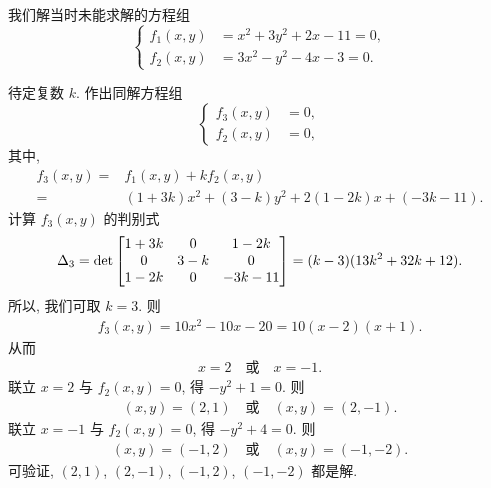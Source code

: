 \documentclass[../libro.tex]{subfiles}
\begin{document}
\begingroup
\renewcommand\thmcontinues[1]{续}
\begin{example}[continues=emp:A0301]
    我们解当时未能求解的方程组
    \begin{equation*}
        \left\{ %
        \begin{aligned}
            f_1 (x, y) & = x^2 + 3y^2 + 2x - 11 = 0, \\
            f_2 (x, y) & = 3x^2 - y^2 - 4x - 3 = 0.
        \end{aligned}
        \right. %
    \end{equation*}

    待定复数 \(k\).
    作出同解方程组
    \begin{equation*}
        \left\{ %
        \begin{aligned}
            f_3 (x, y) & = 0, \\
            f_2 (x, y) & = 0,
        \end{aligned}
        \right. %
    \end{equation*}
    其中,
    \begin{align*}
        f_3 (x, y)
        = {} & f_1 (x, y) + kf_2 (x, y)                    \\
        = {} & (1+3k)x^2 + (3-k)y^2 + 2(1-2k)x + (-3k-11).
    \end{align*}
    计算 \(f_3 (x, y)\) 的判别式
    \begin{align*}
        \Delta_3
        =  \det
        \begin{bmatrix}
            1+3k & 0   & 1-2k   \\
            0    & 3-k & 0      \\
            1-2k & 0   & -3k-11 \\
        \end{bmatrix} 
        = (k-3) (13k^2 + 32k + 12).
    \end{align*}
    所以, 我们可取 \(k = 3\).
    则
    \begin{align*}
        f_3 (x, y) = 10x^2 - 10x - 20 = 10(x - 2)(x + 1).
    \end{align*}
    从而
    \begin{align*}
        x = 2
        \quad \text{或} \quad
        x = -1.
    \end{align*}
    联立 \(x = 2\) 与 \(f_2 (x, y) = 0\),
    得 \(-y^2 + 1 = 0\).
    则
    \begin{align*}
        (x, y) = (2, 1)
        \quad \text{或} \quad
        (x, y) = (2, -1).
    \end{align*}
    联立 \(x = -1\) 与 \(f_2 (x, y) = 0\),
    得 \(-y^2 + 4 = 0\).
    则
    \begin{align*}
        (x, y) = (-1, 2)
        \quad \text{或} \quad
        (x, y) = (-1, -2).
    \end{align*}
    可验证,
    \((2, 1)\), \((2, -1)\), \((-1, 2)\), \((-1, -2)\)
    都是解.
\end{example}
\endgroup
\end{document}
